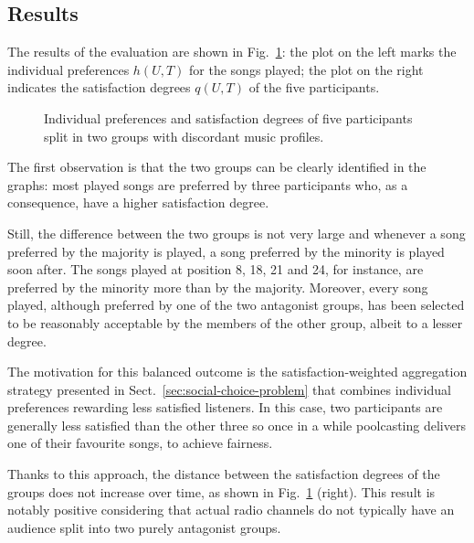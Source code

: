 \subsection{Results} %
\label{sub:results73}

The results of the evaluation are shown in Fig.~\ref{fig:fair_1}: 
the plot on the left marks the individual preferences $h(U,T)$ for the songs played; the plot on the right indicates the satisfaction degrees $q(U,T)$ of the five participants.
%
\begin{figure}[bthp]
\centering \setlength{\abovecaptionskip}{3pt}
\caption{Individual preferences and satisfaction degrees of five participants split in two groups with discordant music profiles.}
\label{fig:fair_1}
\end{figure}


The first observation is that the two groups can be clearly identified in the graphs: most played songs are preferred by three participants who, as a consequence, have a higher satisfaction degree.

Still, the difference between the two groups is not very large and whenever a song preferred by the majority is played, a song preferred by the minority is played soon after. 
The songs played at position 8, 18, 21 and 24, for instance, are preferred by the minority more than by the majority. %
Moreover, every song played, although preferred by one of the two antagonist groups, has been selected to be reasonably acceptable by the members of the other group, albeit to a lesser degree.

The motivation for this balanced outcome is the satisfaction-weighted aggregation strategy presented in Sect.~\ref{sec:social-choice-problem} that combines individual preferences rewarding less satisfied listeners.
In this case, two participants are generally less satisfied than the other three so once in a while poolcasting delivers one of their favourite songs, to achieve fairness.

Thanks to this approach, the distance between the satisfaction degrees of the groups does not increase over time, as shown in Fig.~\ref{fig:fair_1} (right). 
This result is notably positive considering that actual radio channels do not typically have an audience split into two purely antagonist groups.

